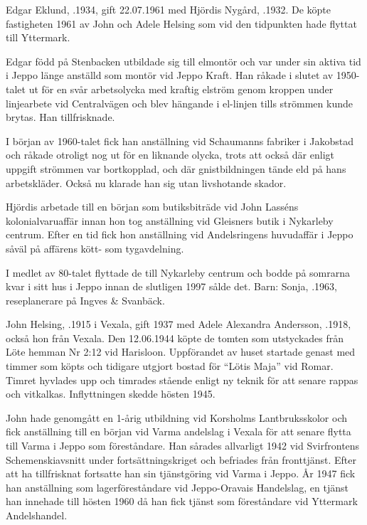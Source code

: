 Edgar Eklund, .1934, gift 22.07.1961 med Hjördis Nygård, .1932. De köpte fastigheten 1961 av John och Adele Helsing som vid den tidpunkten hade flyttat till Yttermark.

Edgar född på Stenbacken utbildade sig till elmontör och var under sin aktiva tid i Jeppo länge anställd som montör vid Jeppo	Kraft. Han 	råkade i slutet av 1950-talet ut för en svår arbetsolycka med kraftig elström genom kroppen under linjearbete vid Centralvägen och blev 	hängande i el-linjen tills strömmen kunde brytas. Han tillfrisknade.

I början av 1960-talet fick han anställning vid Schaumanns fabriker i Jakobstad och råkade otroligt nog ut för en liknande olycka, trots att också där enligt uppgift strömmen var bortkopplad, och där gnistbildningen tände eld på hans arbetskläder. Också nu klarade han sig utan livshotande skador.

Hjördis arbetade till en början som butiksbiträde vid John Lasséns kolonialvaruaffär innan hon tog anställning vid Gleisners butik i Nykarleby centrum. Efter en tid fick hon anställning vid Andelsringens huvudaffär i Jeppo såväl på affärens kött- som tygavdelning.

I medlet av 80-talet flyttade de till Nykarleby centrum och bodde på 	somrarna kvar i sitt hus i Jeppo innan de slutligen 1997 sålde det.
Barn:  Sonja, .1963, reseplanerare på Ingves \& Svanbäck.


John Helsing, .1915 i Vexala, gift 1937 med Adele Alexandra Andersson, .1918, också hon från Vexala. Den 12.06.1944  köpte de tomten som utstyckades från Löte hemman Nr 2:12 vid Harisloon. Uppförandet av huset startade genast med timmer som 	köpts och tidigare utgjort bostad för ``Lötis Maja'' vid Romar. Timret hyvlades upp och timrades stående enligt ny teknik för att senare 	rappas och vitkalkas. Inflyttningen skedde hösten 1945.

John hade genomgått en 1-årig utbildning vid Korsholms Lantbruksskolor och fick anställning till en början vid Varma andelslag i	Vexala för att senare flytta till Varma i Jeppo som föreståndare. Han sårades allvarligt 1942 vid Svirfrontens Schemenskiavsnitt	under fortsättningskriget och befriades från fronttjänst. Efter att ha tillfrisknat fortsatte han sin tjänstgöring vid Varma i Jeppo. År 1947	fick han anställning som lagerföreståndare vid Jeppo-Oravais Handelslag, en tjänst han innehade till hösten 1960 då han fick tjänst som 	föreståndare vid Yttermark Andelshandel.

